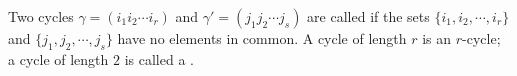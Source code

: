 Two cycles $\gamma = (i_1 i_2 \cdots i_r)$ and $\gamma' = (j_1 j_2 \cdots j_s)$ are called  if the sets $\{i_1, i_2, \cdots, i_r\}$ and $\{j_1, j_2, \cdots, j_s\}$ have no elements in common. A cycle of length $r$ is an $r$-cycle; a cycle of length $2$ is called a .
